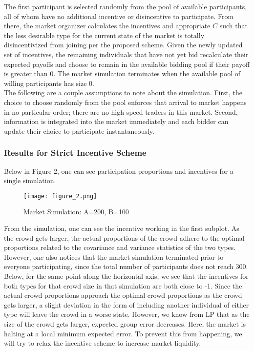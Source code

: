\documentclass[twoside,twocolumn]{article}
\begin{document}
The first participant is selected randomly from the pool of available participants, all of whom have no additional incentive or disincentive to participate. From there, the market organizer calculates the incentives and appropriate $C$ such that the less desirable type for the current state of the market is totally disincentivized from joining per the proposed scheme. Given the newly updated set of incentives, the remaining individuals that have not yet bid recalculate their expected payoffs and choose to remain in the available bidding pool if their payoff is greater than 0. The market simulation terminates when the available pool of willing participants has size 0.\\

The following are a couple assumptions to note about the simulation. First, the choice to choose randomly from the pool enforces that arrival to market happens in no particular order; there are no high-speed traders in this market. Second, information is integrated into the market immediately and each bidder can update their choice to participate instantaneously.

\subsubsection{Results for Strict Incentive Scheme}

Below in Figure 2, one can see participation proportions and incentives for a single simulation.

\begin{figure}[h]
\centering
\texttt{[image: figure\_2.png]}
\caption{Market Simulation: A=200, B=100}
\end{figure}

From the simulation, one can see the incentive working in the first subplot. As the crowd gets larger, the actual proportions of the crowd adhere to the optimal proportions related to the covariance and variance statistics of the two types. However, one also notices that the market simulation terminated prior to everyone participating, since the total number of participants does not reach 300. Below, for the same point along the horizontal axis, we see that the incentives for both types for that crowd size in that simulation are both close to -1. Since the actual crowd proportions approach the optimal crowd proportions as the crowd gets larger, a slight deviation in the form of including another individual of either type will leave the crowd in a worse state. However, we know from LP \cite{3} that as the size of the crowd gets larger, expected group error decreases. Here, the market is halting at a local minimum expected error. To prevent this from happening, we will try to relax the incentive scheme to increase market liquidity.
\end{document}
